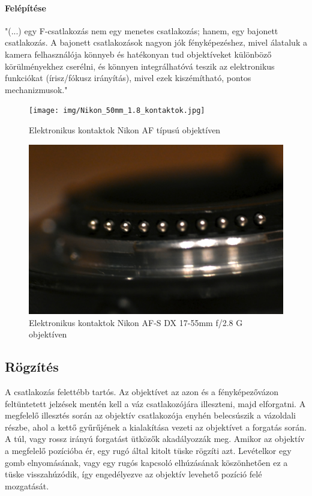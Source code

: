 \paragraph{Felépítése}

"(...) egy F-csatlakozás nem egy menetes csatlakozás; hanem, egy bajonett csatlakozás. A bajonett csatlakozások nagyon jók fényképezéshez, mivel álataluk a kamera felhasználója könnyeb és hatékonyan tud objektíveket különböző körülményekhez cserélni, és könnyen integrálhatóvá teszik az elektronikus funkciókat (írisz/fókusz irányítás), mivel ezek kiszémítható, pontos mechanizmusok."\cite{Nikon-bajonett}

\begin{figure}[H]
	\centering
	\texttt{[image: img/Nikon\_50mm\_1.8\_kontaktok.jpg]}
	\caption{Elektronikus kontaktok Nikon AF típusú objektíven}
	\label{fig:AF_kontakt}
\end{figure}

\begin{figure}[H]
	\centering
	\includegraphics[width=0.5\linewidth]{img/Nikon_17-55_kontaktok.jpg}
	\caption{Elektronikus kontaktok Nikon AF-S DX 17-55mm f/2.8 G objektíven}
	\label{fig:G_kontakt}
\end{figure}

\subsection{Rögzítés}
A csatlakozás felettébb tartós\cite{Nikon_F_mount-ról}.
Az objektívet az azon és a fényképezővázon feltüntetett jelzések mentén kell a váz csatlakozójára illeszteni, majd elforgatni.
A megfelelő illesztés során az objektív csatlakozója enyhén belecsúszik a vázoldali részbe, ahol a kettő gyűrűjének a kialakítása vezeti az objektívet a forgatás során.
A túl, vagy rossz irányú forgatást ütközők akadályozzák meg.
Amikor az objektív a megfelelő pozícióba ér, egy rugó által kitolt tüske rögzíti azt.
Levételkor egy gomb elnyomásának, vagy egy rugós kapcsoló elhúzásának köszönhetően ez a tüske visszahúzódik, így engedélyezve az objektív levehető pozíció felé mozgatását.

